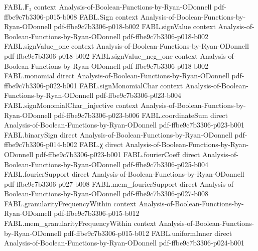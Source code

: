 \begin{theorem}
\label{FABL.expect_dualWalshCharacter_mul}
\leanok
{}
\proofstep
  {FABL.𝔽₂}
  {context}
  {Analysis-of-Boolean-Functions-by-Ryan-ODonnell}
  {pdf-ffbe9c7b3306-p015-b008}
\proofstep
  {FABL.Sign}
  {context}
  {Analysis-of-Boolean-Functions-by-Ryan-ODonnell}
  {pdf-ffbe9c7b3306-p018-b002}
\proofstep
  {FABL.signValue}
  {context}
  {Analysis-of-Boolean-Functions-by-Ryan-ODonnell}
  {pdf-ffbe9c7b3306-p018-b002}
\proofstep
  {FABL.signValue_one}
  {context}
  {Analysis-of-Boolean-Functions-by-Ryan-ODonnell}
  {pdf-ffbe9c7b3306-p018-b002}
\proofstep
  {FABL.signValue_neg_one}
  {context}
  {Analysis-of-Boolean-Functions-by-Ryan-ODonnell}
  {pdf-ffbe9c7b3306-p018-b002}
\proofstep
  {FABL.monomial}
  {direct}
  {Analysis-of-Boolean-Functions-by-Ryan-ODonnell}
  {pdf-ffbe9c7b3306-p022-b001}
\proofstep
  {FABL.signMonomialChar}
  {context}
  {Analysis-of-Boolean-Functions-by-Ryan-ODonnell}
  {pdf-ffbe9c7b3306-p023-b004}
\proofstep
  {FABL.signMonomialChar_injective}
  {context}
  {Analysis-of-Boolean-Functions-by-Ryan-ODonnell}
  {pdf-ffbe9c7b3306-p023-b006}
\proofstep
  {FABL.coordinateSum}
  {direct}
  {Analysis-of-Boolean-Functions-by-Ryan-ODonnell}
  {pdf-ffbe9c7b3306-p023-b001}
\proofstep
  {FABL.binarySign}
  {direct}
  {Analysis-of-Boolean-Functions-by-Ryan-ODonnell}
  {pdf-ffbe9c7b3306-p014-b002}
\proofstep
  {FABL.χ}
  {direct}
  {Analysis-of-Boolean-Functions-by-Ryan-ODonnell}
  {pdf-ffbe9c7b3306-p023-b001}
\proofstep
  {FABL.fourierCoeff}
  {direct}
  {Analysis-of-Boolean-Functions-by-Ryan-ODonnell}
  {pdf-ffbe9c7b3306-p025-b004}
\proofstep
  {FABL.fourierSupport}
  {direct}
  {Analysis-of-Boolean-Functions-by-Ryan-ODonnell}
  {pdf-ffbe9c7b3306-p027-b008}
\proofstep
  {FABL.mem_fourierSupport}
  {direct}
  {Analysis-of-Boolean-Functions-by-Ryan-ODonnell}
  {pdf-ffbe9c7b3306-p027-b008}
\proofstep
  {FABL.granularityFrequencyWithin}
  {context}
  {Analysis-of-Boolean-Functions-by-Ryan-ODonnell}
  {pdf-ffbe9c7b3306-p015-b012}
\proofstep
  {FABL.mem_granularityFrequencyWithin}
  {context}
  {Analysis-of-Boolean-Functions-by-Ryan-ODonnell}
  {pdf-ffbe9c7b3306-p015-b012}
\proofstep
  {FABL.uniformInner}
  {direct}
  {Analysis-of-Boolean-Functions-by-Ryan-ODonnell}
  {pdf-ffbe9c7b3306-p024-b001}

\end{theorem}

